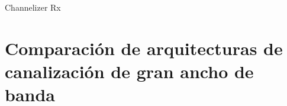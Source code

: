 \documentclass[ignorenonframetext,12pt]{beamer}
\begin{document}
\begin{frame}{Channelizer Rx}
				\begin{center}
				\end{center}
								\begin{center}
								\end{center}
\end{frame}
\section{Comparación de arquitecturas de canalización de gran ancho de banda}
\end{document}
